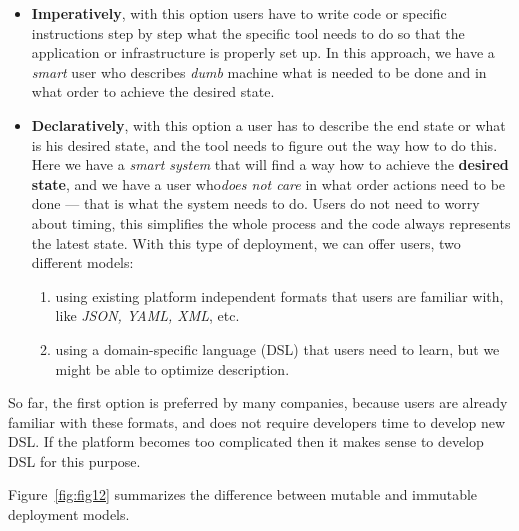 \begin{itemize}\label{lab:dep_types}
	\item \textbf{Imperatively}, with this option users have to write code or specific instructions step by step what the specific tool needs to do so that the application or infrastructure is properly set up. In this approach, we have a \textit{smart} user who describes \textit{dumb} machine what is needed to be done and in what order to achieve the desired state.
	\item \textbf{Declaratively}, with this option a user has to describe the end state or what is his desired state, and the tool needs to figure out the way how to do this. Here we have a \textit{smart system} that will find a way how to achieve the \textbf{desired state}, and we have a user who\textit{does not care} in what order actions need to be done --- that is what the system needs to do. Users do not need to worry about timing, this simplifies the whole process and the code always represents the latest state. With this type of deployment, we can offer users, two different models:
	
	\begin{enumerate}[start=1,label={(\bfseries \arabic*)}]
		\item using existing platform independent formats that users are familiar with, like \textit{JSON, YAML, XML}, etc.
		\item using a domain-specific language (DSL) that users need to learn, but we might be able to optimize description.
	\end{enumerate}
\end{itemize}

\noindent
So far, the first option is preferred by many companies, because users are already familiar with these formats, and does not require developers time to develop new DSL. If the platform becomes too complicated then it makes sense to develop DSL for this purpose.

Figure~\ref{fig:fig12} summarizes the difference between mutable and immutable deployment models.

